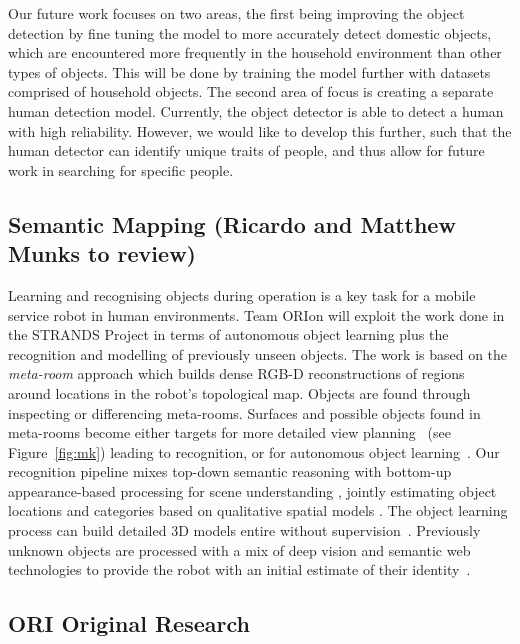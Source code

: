 \documentclass[runningheads,a4paper]{llncs}
\newcommand{\teamori}{Team ORIon}
\begin{document}
Our future work focuses on two areas, the first being improving the object detection by fine tuning the model to more accurately detect domestic objects, which are encountered more frequently in the household environment than other types of objects. This will be done by training the model further with datasets comprised of household objects. The second area of focus is creating a separate human detection model. Currently, the object detector is able to detect a human with high reliability. However, we would like to develop this further, such that the human detector can identify unique traits of people, and thus allow for future work in searching for specific people.


\subsection{Semantic Mapping (Ricardo and Matthew Munks to review)}

Learning and recognising objects during operation is a key task for a mobile service robot in human environments. \teamori{} will exploit the work done in the STRANDS Project in terms of autonomous object learning plus the recognition and modelling of previously unseen objects. The work is based on the \emph{meta-room} approach which builds dense RGB-D reconstructions of regions around locations in the robot's topological map. Objects are found through inspecting or differencing meta-rooms. Surfaces and possible objects found in meta-rooms become either targets for more detailed view planning~\cite{kunze14indirect} (see Figure~\ref{fig:mk}) leading to recognition, or for autonomous object learning~\cite{Faeulhammer:2016}. Our recognition pipeline mixes top-down semantic reasoning with bottom-up appearance-based processing for scene understanding \cite{kunze14topdown}, jointly estimating object locations and categories based on qualitative spatial models \cite{kunze14bootstrapping}. The object learning process can build detailed 3D models entire without supervision~\cite{Faeulhammer:2016}. Previously unknown  objects are processed with a mix of deep vision and semantic web technologies to provide the robot with an initial estimate of their identity~\cite{aloof@icra17}.

\subsection{ORI Original Research}
\end{document}
